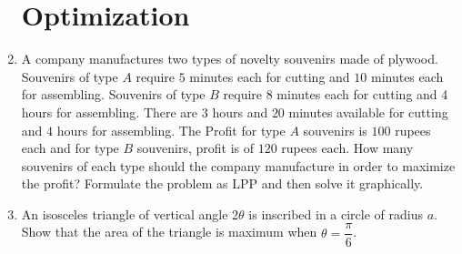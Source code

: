 \documentclass[12pt,-letter paper]{article}
\begin{document}
\begin{enumerate}

\section*{Optimization}

\item A company manufactures two types of novelty souvenirs made of plywood. Souvenirs of type $A$ require $5$ minutes each for cutting and $10$ minutes each for assembling. Souvenirs of type $B$ require $8$ minutes each for cutting and $4$ hours for assembling. There are $3$ hours and $20$ minutes available for cutting and $4$ hours for assembling. The Profit for type $A$ souvenirs is $100$ rupees each and for type $B$ souvenirs, profit is of $120$ rupees each. How many souvenirs of each type should the company manufacture in order to maximize the profit? Formulate the problem as LPP and then solve it graphically.

\item An isosceles triangle of vertical angle $2\theta$ is inscribed in a circle  of radius $a$. Show that the area of the triangle is maximum when $\theta =\dfrac{\pi}{6}$.
\end{enumerate}      
\end{document}
